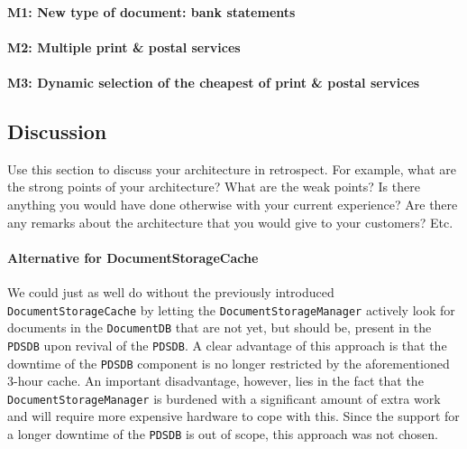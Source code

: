 \documentclass[a4paper,10pt]{article}
\begin{document}
\paragraph{M1\@: New type of document: bank statements}

\paragraph{M2\@: Multiple print \& postal services}

\paragraph{M3\@: Dynamic selection of the cheapest of print \& postal services}

\subsection{Discussion}
Use this section to discuss your architecture in retrospect.
For example, what are the strong points of your architecture?
What are the weak points? Is there anything you would have done otherwise with
your current experience?
Are there any remarks about the architecture that you would give to your
customers?
Etc.

\paragraph{Alternative for DocumentStorageCache}
We could just as well do without the previously introduced \texttt{DocumentStorageCache} by letting the \texttt{DocumentStorageManager} actively look for documents in the \texttt{DocumentDB} that are not yet, but should be, present in the \texttt{PDSDB} upon revival of the \texttt{PDSDB}. A clear advantage of this approach is that the downtime of the \texttt{PDSDB} component is no longer restricted by the aforementioned 3-hour cache. An important disadvantage, however, lies in the fact that the \texttt{DocumentStorageManager} is burdened with a significant amount of extra work and will require more expensive hardware to cope with this. Since the support for a longer downtime of the \texttt{PDSDB} is out of scope, this approach was not chosen.

\end{document}
